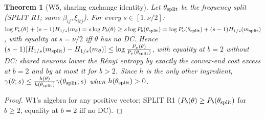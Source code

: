 \documentclass[11pt]{article}
\newtheorem{theorem}{Theorem}\newtheorem{lemma}[theorem]{Lemma}\newtheorem{corollary}[theorem]{Corollary}
\theoremstyle{remark}\newtheorem{remark}[theorem]{Remark}
\newcommand{\Hr}{H_{1/s}}
\begin{document}
\begin{theorem}[W5, sharing exchange identity]\label{W5}
Let $\theta_{\rm split}$ be the frequency split (SPLIT R1; same $\beta_{ij},\xi_{itj}$). For every $s\in[1,\nu/2]$:
$\log P_\nu(\theta)+(s-1)\Hr(m_\theta)=s\log P_b(\theta)\ge s\log P_b(\theta_{\rm split})=\log P_\nu(\theta_{\rm split})+(s-1)\Hr(m_{\rm split})$,
with equality at $s=\nu/2$ iff $\theta$ has no DC. Hence $(s-1)[\Hr(m_{\rm split})-\Hr(m_\theta)]\le\log\frac{P_\nu(\theta)}{P_\nu(\theta_{\rm split})}$,
with equality at $b=2$ without DC: shared neurons lower the Rényi entropy by exactly the convex-end cost excess at $b=2$ and by at most it for $b>2$.
Since $h$ is the only other ingredient, $\gamma(\theta;s)\le\frac{h(\theta)}{h(\theta_{\rm split})}\gamma(\theta_{\rm split};s)$ when $h(\theta_{\rm split})>0$.
\end{theorem}
\begin{proof}
W1's algebra for any positive vector; SPLIT R1 ($P_b(\theta)\ge P_b(\theta_{\rm split})$ for $b\ge2$, equality at $b=2$ iff no DC).
\end{proof}
\end{document}
